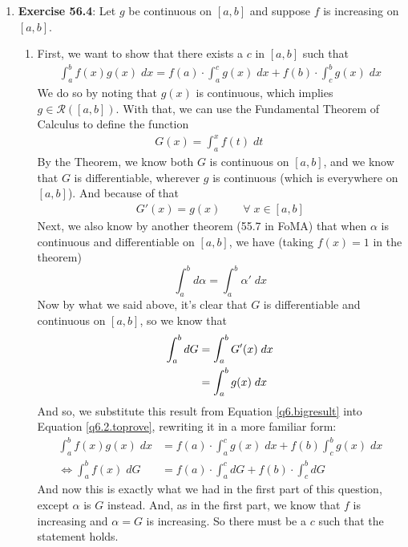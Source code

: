 \documentclass[12pt]{article}
\theoremstyle{plain}
\theoremstyle{definition}
\theoremstyle{remark}
\begin{document}
\begin{enumerate}
\begin{enumerate}
\item 
\textbf{Exercise 56.4}: Let $g$ be continuous on $[a,b]$ and suppose $f$ is increasing on $[a,b]$.
\begin{enumerate}
\item First, we want to show that there exists a $c$ in $[a,b]$ such that 
\begin{align}
    \label{q6.2.toprove}
    \int^b_a f(x)g(x)\;dx = f(a) \cdot \int^c_a g(x)\;dx
        + f(b) \cdot \int^b_c g(x)\;dx
\end{align}
We do so by noting that $g(x)$ is continuous, which implies $g\in\mathscr{R}([a,b])$. With that, we can use the Fundamental Theorem of Calculus to define the function
\begin{align*}
    G(x) = \int^x_a f(t)\;dt \qquad
\end{align*}
By the Theorem, we know both $G$ is continuous on $[a,b]$, and we know that $G$ is differentiable, wherever $g$ is continuous (which is everywhere on $[a,b]$). And because of that 
\begin{align*}
    G'(x) = g(x) \qquad \forall \; x\in[a,b] 
\end{align*}
Next, we also know by another theorem (55.7 in FoMA) that when $\alpha$ is continuous and differentiable on $[a,b]$, we have (taking $f(x)=1$ in the theorem)
\[ 
    \int^b_a d\alpha = \int^b_a \alpha' \; dx 
\]
Now by what we said above, it's clear that $G$ is differentiable and continuous on $[a,b]$, so we know that 
\begin{align}
    \int^b_a dG &= \int^b_a G'(x) \;dx\notag\\
    &= \int^b_a g(x) \;dx
    \label{q6.bigresult}
\end{align}
And so, we substitute this result from Equation \ref{q6.bigresult} into Equation \ref{q6.2.toprove}, rewriting it in a more familiar form:
\begin{align*}
    \int^b_a f(x)g(x)\;dx &= f(a) \cdot \int^c_a g(x)\;dx
        + f(b) \int^b_c g(x)\;dx\\
    \Leftrightarrow
    \int^b_a f(x)\;dG 
    &= f(a) \cdot \int^c_a dG
        + f(b) \cdot \int^b_c dG
\end{align*}
And now this is exactly what we had in the first part of this question, except $\alpha$ is $G$ instead. And, as in the first part, we know that $f$ is increasing and $\alpha=G$ is increasing.  So there must be a $c$ such that the statement holds.


\end{enumerate}
\end{enumerate}
\end{enumerate}
\end{document}
